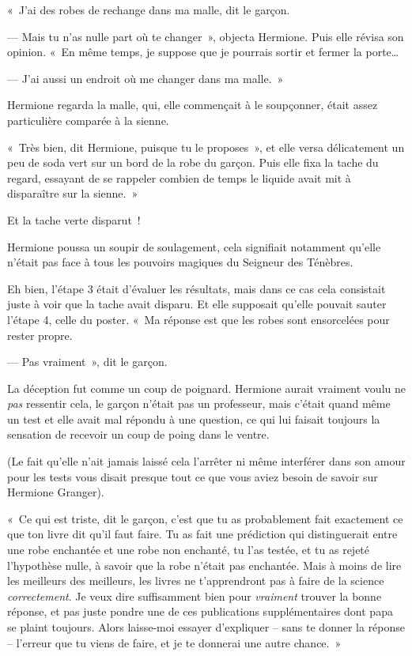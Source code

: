 «~J'ai des robes de rechange dans ma malle, dit le garçon.

--- Mais tu n'as nulle part où te changer~», objecta Hermione. Puis elle révisa son opinion. «~En même temps, je suppose que je pourrais sortir et fermer la porte…

--- J'ai aussi un endroit où me changer dans ma malle.~»

Hermione regarda la malle, qui, elle commençait à le soupçonner, était assez particulière comparée à la sienne.

«~Très bien, dit Hermione, puisque tu le proposes~», et elle versa délicatement un peu de soda vert sur un bord de la robe du garçon.
Puis elle fixa la tache du regard, essayant de se rappeler combien de temps le liquide avait mit à disparaître sur la sienne.~»

Et la tache verte disparut~!

Hermione poussa un soupir de soulagement, cela signifiait notamment qu'elle n'était pas face à tous les pouvoirs magiques du Seigneur des Ténèbres.

Eh bien, l'étape 3 était d'évaluer les résultats, mais dans ce cas cela consistait juste à voir que la tache avait disparu.
Et elle supposait qu'elle pouvait sauter l'étape 4, celle du poster.
«~Ma réponse est que les robes sont ensorcelées pour rester propre.

--- Pas vraiment~», dit le garçon.

La déception fut comme un coup de poignard.
Hermione aurait vraiment voulu ne \emph{pas} ressentir cela, le garçon n'était pas un professeur, mais c'était quand même un test et elle avait mal répondu à une question, ce qui lui faisait toujours la sensation de recevoir un coup de poing dans le ventre.

(Le fait qu'elle n'ait jamais laissé cela l'arrêter ni même interférer dans son amour pour les tests vous disait presque tout ce que vous aviez besoin de savoir sur Hermione Granger).

«~Ce qui est triste, dit le garçon, c'est que tu as probablement fait exactement ce que ton livre dit qu'il faut faire.
Tu as fait une prédiction qui distinguerait entre une robe enchantée et une robe non enchanté, tu l'as testée, et tu as rejeté l'hypothèse nulle, à savoir que la robe n'était pas enchantée.
Mais à moins de lire les meilleurs des meilleurs, les livres ne t'apprendront pas à faire de la science \emph{correctement}.
Je veux dire suffisamment bien pour \emph{vraiment} trouver la bonne réponse, et pas juste pondre une de ces publications supplémentaires dont papa se plaint toujours.
Alors laisse-moi essayer d'expliquer -- sans te donner la réponse -- l'erreur que tu viens de faire, et je te donnerai une autre chance.~»

